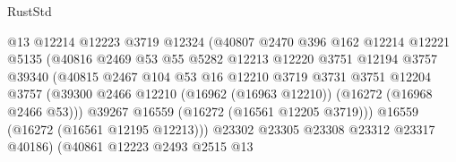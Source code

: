 \begin{lexlean}{RustStd}
\begin{coremodule}
                                    @13
                                    @12214
                                    @12223
                                    @3719
                                    @12324
                                    (@40807
                                      @2470
                                      @396
                                      @162
                                      @12214
                                      @12221
                                      @5135
                                      (@40816
                                        @2469
                                        @53
                                        @55
                                        @5282
                                        @12213
                                        @12220
                                        @3751
                                        @12194
                                        @3757
                                        @39340
                                        (@40815
                                          @2467
                                          @104
                                          @53
                                          @16
                                          @12210
                                          @3719
                                          @3731
                                          @3751
                                          @12204
                                          @3757
                                          (@39300
                                            @2466
                                            @12210
                                            (@16962 (@16963 @12210))
                                            (@16272 (@16968 @2466 @53)))
                                          @39267
                                          @16559
                                          (@16272 (@16561 @12205 @3719)))
                                        @16559
                                        (@16272 (@16561 @12195 @12213)))
                                      @23302
                                      @23305
                                      @23308
                                      @23312
                                      @23317
                                      @40186)
                                    (@40861
                                      @12223
                                      @2493
                                      @2515
                                      @13

\end{coremodule}
\end{lexlean}
